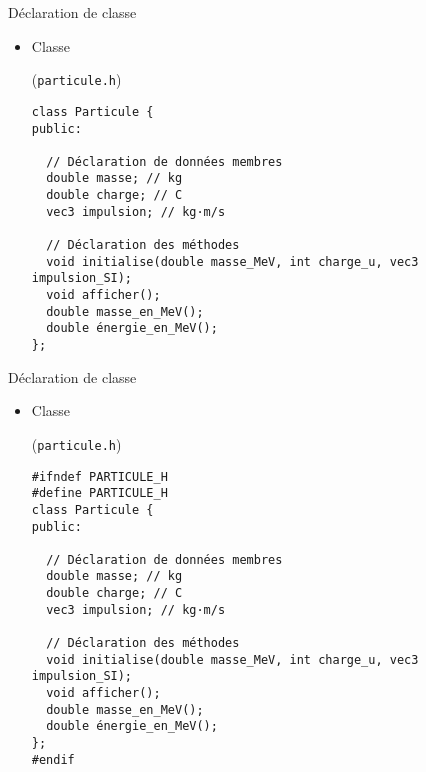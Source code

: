 \documentclass[c]{beamer}
\begin{document}

\begin{frame}[fragile]{Déclaration de classe}

\begin{itemize}
\item Classe 
\begin{cbox}[][lwuc](\texttt{particule.h})
\begin{verbatim}
class Particule {
public:

  // Déclaration de données membres
  double masse; // kg
  double charge; // C
  vec3 impulsion; // kg·m/s

  // Déclaration des méthodes
  void initialise(double masse_MeV, int charge_u, vec3 impulsion_SI);
  void afficher();
  double masse_en_MeV();
  double énergie_en_MeV();
};
\end{verbatim}
\end{cbox}
\end{itemize}

\end{frame}


\begin{frame}[fragile]{Déclaration de classe}

\begin{itemize}
\item Classe 
\begin{cbox}[][lwuc](\texttt{particule.h})
\begin{verbatim}
#ifndef PARTICULE_H
#define PARTICULE_H    
class Particule {
public:

  // Déclaration de données membres
  double masse; // kg
  double charge; // C
  vec3 impulsion; // kg·m/s

  // Déclaration des méthodes
  void initialise(double masse_MeV, int charge_u, vec3 impulsion_SI);
  void afficher();
  double masse_en_MeV();
  double énergie_en_MeV();
};
#endif
\end{verbatim}
\end{cbox}
\end{itemize}

\end{frame}
\end{document}
